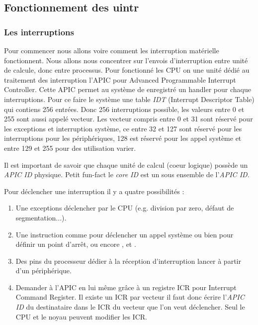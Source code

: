 \subsection{Fonctionnement des uintr}

\subsubsection{Les interruptions}

Pour commencer nous allons voire comment les interruption matérielle fonctionnent.
Nous allons nous concentrer sur l'envois d'interruption entre unité de calcule, donc entre processus.
Pour fonctionné les CPU on une unité dédié au traitement des interruption l'APIC pour Advanced Programmable Interrupt Controller.
Cette APIC permet au système de enregistré un handler pour chaque interruptions.
Pour ce faire le système une table \emph{IDT} (Interrupt Descriptor Table) qui contiens 256 entrées.
Donc 256 interruptions possible, les valeurs entre 0 et 255 sont aussi appelé vecteur.
Les vecteur compris entre 0 et 31 sont réservé pour les exceptions et interruption système, ce entre 32 et 127 sont réservé pour les interruptions pour les périphériques,
128 est réservé pour les appel système et entre 129 et 255 pour des utilisation varier.

Il est important de savoir que chaque unité de calcul (coeur logique) possède un \emph{APIC ID} physique.
Petit fun-fact le \emph{core ID} est un sous ensemble de l'\emph{APIC ID}.

Pour déclencher une interruption il y a quatre possibilités :

\begin{enumerate}
  \item Une exceptions déclencher par le CPU (e.g. division par zero, défaut de segmentation...).
  \item Une instruction comme  pour déclencher un appel système ou bien  pour définir un point d'arrêt, ou encore ,  et .
  \item Des pins du processeur dédier à la réception d'interruption lancer à partir d'un périphérique.
  \item Demander à l'APIC en lui même grâce à un registre ICR pour Interrupt Command Register.
  Il existe un ICR par vecteur il faut donc écrire l'\emph{APIC ID} du destinataire dans le ICR du vecteur que l'on veut déclencher.
  Seul le CPU et le noyau peuvent modifier les ICR.
\end{enumerate}


